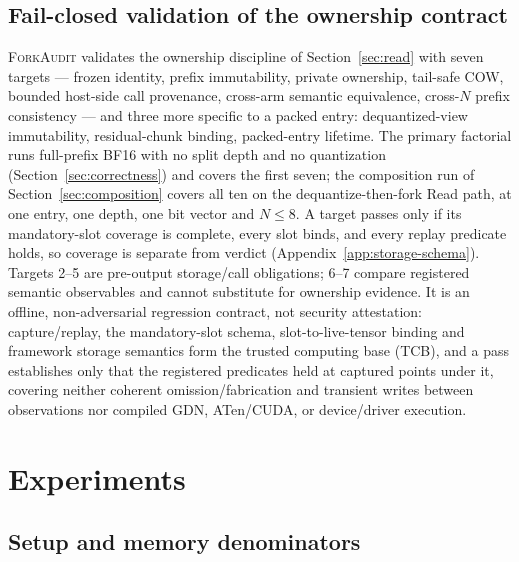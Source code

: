 \documentclass{article}
\newcommand{\method}{\textsc{ForkAudit}}
\begin{document}
\subsection{Fail-closed validation of the ownership contract}
\label{sec:contract}
\method{} validates the ownership discipline of Section~\ref{sec:read} with
seven targets --- frozen identity, prefix immutability, private ownership,
tail-safe COW, bounded host-side call provenance, cross-arm semantic
equivalence, cross-\(N\) prefix consistency --- and three more specific to a
packed entry: dequantized-view immutability, residual-chunk binding,
packed-entry lifetime.  The primary factorial runs full-prefix BF16 with no
split depth and no quantization (Section~\ref{sec:correctness}) and covers the
first seven; the composition run of Section~\ref{sec:composition} covers all
ten on the dequantize-then-fork Read path, at one entry, one depth, one bit
vector and $N\leq8$.  A target passes only if its mandatory-slot coverage is
complete, every slot binds, and every replay predicate holds, so coverage is
separate from verdict (Appendix~\ref{app:storage-schema}). Targets 2--5 are
pre-output storage/call obligations; 6--7 compare registered semantic
observables and cannot substitute for ownership evidence. It is an offline,
non-adversarial
regression contract, not security attestation: capture/replay, the
mandatory-slot schema, slot-to-live-tensor binding and framework storage
semantics form the trusted computing base (TCB), and a pass establishes only
that the registered predicates held at captured points under it, covering
neither coherent omission/fabrication and transient writes between
observations nor compiled GDN, ATen/CUDA, or device/driver execution.

\section{Experiments}
\label{sec:experiments}
\label{sec:protocol}

\subsection{Setup and memory denominators}
\label{sec:setup}
\end{document}
